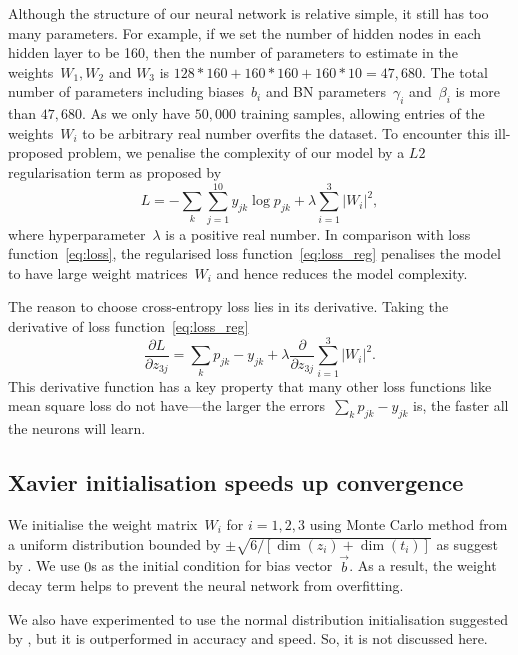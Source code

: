 Although the structure of our neural network is relative simple, it still has too many parameters. For example, if we set the number of hidden nodes in each hidden layer to be 160, then the number of parameters to estimate in the weights~$W_1,W_2$ and $W_3$ is $128*160+160*160+160*10=47,680$. The total number of parameters including biases~$b_i$ and BN parameters~$\gamma_i$ and~$\beta_i$ is more than $47,680$. As we only have $50,000$ training samples, allowing entries of the weights~$W_i$ to be arbitrary real number overfits the dataset. To encounter this ill-proposed problem, we penalise the complexity of our model by a $L2$ regularisation term as proposed by \citet{doi:10.1080/00401706.1970.10488634}
\begin{equation}
  {L=-\sum_k\sum _{j=1}^{10} y_{jk}\log p_{jk}}+\lambda\sum _{i=1}^3\left|W_i\right|^2,  \label{eq:loss_reg}
\end{equation}
where hyperparameter~$\lambda$ is a positive real number.
In comparison with loss function~\eqref{eq:loss}, the regularised loss function~\eqref{eq:loss_reg} penalises the model to have large weight matrices~$W_i$ and hence reduces the model complexity.

The reason to choose cross-entropy loss lies in its derivative. Taking the derivative of loss function~\eqref{eq:loss_reg}
\begin{equation*}
  \frac{\partial L}{\partial z_{3j}}=\sum_k p_{jk}-y_{jk}+\lambda\frac{\partial }{\partial z_{3j}}\sum _{i=1}^3\left|W_i\right|^2.  
\end{equation*}
This derivative function has a key property that many other loss functions like mean square loss do not have---the larger the errors~$\sum_k p_{jk}-y_{jk}$ is, the faster all the neurons will learn.

\subsection{Xavier initialisation speeds up convergence\label{sec:xav}}
We initialise the weight matrix~$W_i$ for $i=1,2,3$ using Monte Carlo method from a uniform distribution bounded by $\pm \sqrt{6/\left[\dim(z_i)+\dim(t_i)\right]}$ as suggest by \citet{pmlr-v9-glorot10a}. We use $0$s as the initial condition for bias vector~$\vec b$. As a result, the weight decay term helps to prevent the neural network from overfitting.

We also have experimented to use the normal distribution initialisation suggested by \citet{pmlr-v9-glorot10a}, but it is outperformed in accuracy and speed. So, it is not discussed here.

